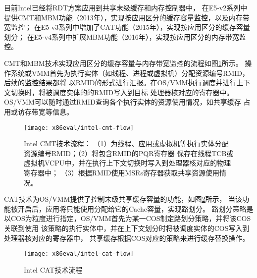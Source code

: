 目前Intel已经将RDT方案应用到共享末级缓存和内存控制器中，
在E5-v2系列中提供CMT和MBM功能（2013年），实现按应用区分的缓存容量监控，以及内存带宽监控；
在E5-v3系列中增加了CAT功能（2015年），实现按应用区分的缓存容量划分；
在E5-v4系列中扩展MBM功能（2016年），实现按应用区分的内存带宽监控。

CMT和MBM技术实现应用区分的缓存容量与内存带宽监控的流程如图\ref{fig:intel-cmt-flow}所示。
操作系统或VMM首先为执行实体（如线程、进程或虚拟机）分配资源编号RMID，后续的监控结果都将
以RMID的形式进行汇报。在OS/VMM执行调度并进行上下文切换时，将被调度实体的的RMID写入到目标
处理器核对应的寄存器中。OS/VMM可以随时通过RMID查询各个执行实体的资源使用情况，如共享缓存
占用或访存带宽等信息。
 
\begin{figure}[H]
  \centering
  \texttt{[image: x86eval/intel-cmt-flow]}
  \caption[Intel Cache Monitor Technology (CMT) 技术流程]{Intel CMT技术流程：
   （1）为线程、应用或虚拟机等执行实体分配资源编号RMID；（2）将包含RMID的PQR寄存器
   保存在线程TCB或虚拟机VCPU中，并在执行上下文切换时写入到处理器核对应的物理寄存器中；
   （3）根据RMID使用MSRs寄存器获取共享资源使用情况。}
  \label{fig:intel-cmt-flow}
\end{figure}

CAT技术为OS/VMM提供了控制末级共享缓存容量的功能，如图\ref{fig:intel-cat-flow}所示，
当该功能被开启后，应用将只能使用分配给它的Cache容量，实现路划分。
路划分策略是以COS为粒度进行指定，OS/VMM首先为某一COS制定路划分策略，并将该COS关联到使用
该策略的执行实体中，并在上下文划分时将被调度实体的COS写入到处理器核对应的寄存器中，
共享缓存根据COS对应的策略来进行缓存替换操作。

\begin{figure}[H]
  \centering
  \texttt{[image: x86eval/intel-cat-flow]}
  \caption[Intel Cache Allocation Technology (CAT) 技术流程]{Intel CAT技术流程}
  \label{fig:intel-cat-flow}
\end{figure}


